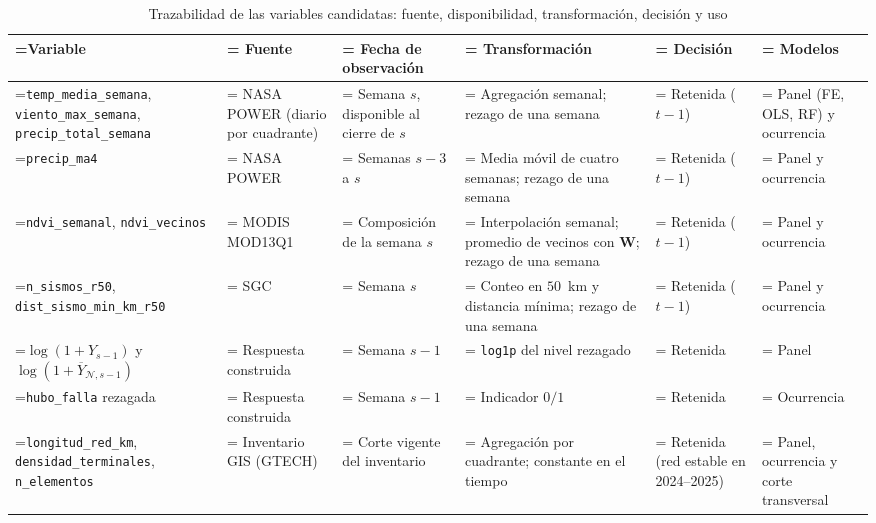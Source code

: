 \begin{landscape}
\begin{table}[!htbp]
\centering\scriptsize
\setlength{\tabcolsep}{3pt}\renewcommand{\arraystretch}{1.05}
\caption{Trazabilidad de las variables candidatas: fuente, disponibilidad, transformación, decisión y uso}
\label{tab:trazabilidad_variables}
\begin{tabularx}{\linewidth}{@{} >{\raggedright\arraybackslash\hsize=1.25\hsize\linewidth=\hsize}X >{\raggedright\arraybackslash\hsize=0.85\hsize\linewidth=\hsize}X >{\raggedright\arraybackslash\hsize=0.85\hsize\linewidth=\hsize}X >{\raggedright\arraybackslash\hsize=1.1\hsize\linewidth=\hsize}X >{\raggedright\arraybackslash\hsize=1.0\hsize\linewidth=\hsize}X >{\raggedright\arraybackslash\hsize=0.95\hsize\linewidth=\hsize}X @{}}
\toprule
\textbf{Variable} & \textbf{Fuente} & \textbf{Fecha de observación} & \textbf{Transformación} & \textbf{Decisión} & \textbf{Modelos} \\
\midrule
\texttt{temp\_media\_semana}, \texttt{viento\_max\_semana}, \texttt{precip\_total\_semana} & NASA POWER (diario por cuadrante) & Semana $s$, disponible al cierre de $s$ & Agregación semanal; rezago de una semana & Retenida ($t-1$) & Panel (FE, OLS, RF) y ocurrencia \\
\texttt{precip\_ma4} & NASA POWER & Semanas $s-3$ a $s$ & Media móvil de cuatro semanas; rezago de una semana & Retenida ($t-1$) & Panel y ocurrencia \\
\texttt{ndvi\_semanal}, \texttt{ndvi\_vecinos} & MODIS MOD13Q1 & Composición de la semana $s$ & Interpolación semanal; promedio de vecinos con $\mathbf{W}$; rezago de una semana & Retenida ($t-1$) & Panel y ocurrencia \\
\texttt{n\_sismos\_r50}, \texttt{dist\_sismo\_min\_km\_r50} & SGC & Semana $s$ & Conteo en $50$~km y distancia mínima; rezago de una semana & Retenida ($t-1$) & Panel y ocurrencia \\
$\log(1+Y_{s-1})$ y $\log(1+\overline{Y}_{\mathcal{N},s-1})$ & Respuesta construida & Semana $s-1$ & \texttt{log1p} del nivel rezagado & Retenida & Panel \\
\texttt{hubo\_falla} rezagada & Respuesta construida & Semana $s-1$ & Indicador $0/1$ & Retenida & Ocurrencia \\
\texttt{longitud\_red\_km}, \texttt{densidad\_terminales}, \texttt{n\_elementos} & Inventario GIS (GTECH) & Corte vigente del inventario & Agregación por cuadrante; constante en el tiempo & Retenida (red estable en 2024--2025) & Panel, ocurrencia y corte transversal \\

\end{tabularx}
\end{table}
\end{landscape}
